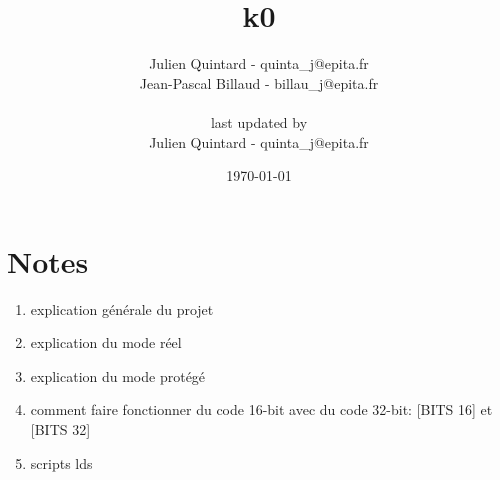 \documentclass[10pt,a4wide]{article}
\title{k0}
\author{Julien Quintard - \small{quinta\_j@epita.fr} \\
        Jean-Pascal Billaud - \small{billau\_j@epita.fr} \\ \\
	\small{last updated by} \\
	Julien Quintard - \small{quinta\_j@epita.fr}}
\date{\today}
\begin{document}
\maketitle

\section{Notes}

\begin{enumerate}

\item explication g\'en\'erale du projet

\item explication du mode r\'eel

\item explication du mode prot\'eg\'e

\item comment faire fonctionner du code 16-bit avec du code 32-bit:
      [BITS 16] et [BITS 32]

\item scripts lds

\end{enumerate}
\end{document}
